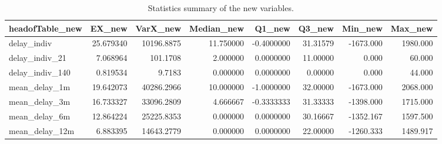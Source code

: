 \documentclass[
]{article}
\begin{document}
\begin{table}

\caption{\label{tab:Statss}Statistics summary of the new variables.}
\centering
\begin{tabular}[t]{l|r|r|r|r|r|r|r}
\hline
headofTable\_new & EX\_new & VarX\_new & Median\_new & Q1\_new & Q3\_new & Min\_new & Max\_new\\
\hline
delay\_indiv & 25.679340 & 10196.8875 & 11.750000 & -0.4000000 & 31.31579 & -1673.000 & 1980.000\\
\hline
delay\_indiv\_21 & 7.068964 & 101.1708 & 2.000000 & 0.0000000 & 11.00000 & 0.000 & 60.000\\
\hline
delay\_indiv\_140 & 0.819534 & 9.7183 & 0.000000 & 0.0000000 & 0.00000 & 0.000 & 44.000\\
\hline
mean\_delay\_1m & 19.642073 & 40286.2966 & 10.000000 & -1.0000000 & 32.00000 & -1673.000 & 2068.000\\
\hline
mean\_delay\_3m & 16.733327 & 33096.2809 & 4.666667 & -0.3333333 & 31.33333 & -1398.000 & 1715.000\\
\hline
mean\_delay\_6m & 12.864224 & 25225.8353 & 0.000000 & 0.0000000 & 30.16667 & -1352.167 & 1597.500\\
\hline
mean\_delay\_12m & 6.883395 & 14643.2779 & 0.000000 & 0.0000000 & 22.00000 & -1260.333 & 1489.917\\
\hline
\end{tabular}
\end{table}
\end{document}
